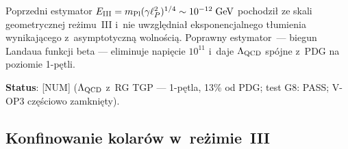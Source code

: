 \begin{proposition}
\begin{remark}%
\label{rem:V-G8-old}
Poprzedni estymator $E_{\rm III} = m_{\rm Pl}(\gamma\ell_P^2)^{1/4}
\sim 10^{-12}\;\mathrm{GeV}$ pochodzi\l{} ze skali geometrycznej
re\.zimu~III i~nie uwzgl\k{e}dnia\l{} eksponencjalnego t\l{}umienia
wynikaj\k{a}cego z~asymptotyczn\k{a} wolno\'sci\k{a}.
Poprawny estymator~--- biegun Landaua funkcji beta --- eliminuje
napięcie $10^{11}$ i~daje $\Lambda_{\rm QCD}$ sp\'ojne z~PDG
na poziomie 1-p\k{e}tli.
\end{remark}

\textbf{Status}:  [NUM]
($\Lambda_{\rm QCD}$ z~RG TGP --- 1-p\k{e}tla, 13\% od PDG;
test G8: PASS; V-OP3 cz\k{e}\'{s}ciowo zamkni\k{e}ty).
\end{proposition}

\subsection{Konfinowanie kolar\'ow w~re\.zimie~III}\label{app:V-conf}


